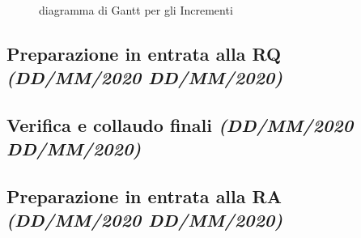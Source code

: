 \documentclass[../piano-di-progetto.tex]{subfiles}
\begin{document}
\begin{figure}[H]
  \centering
  
  \caption{diagramma di Gantt per gli Incrementi}%
~~\label{fig:gantt_incrementi}
\end{figure}
\subsection[Preparazione in entrata alla RQ]{Preparazione in entrata alla RQ {\normalsize\normalfont\itshape(DD/MM/2020  DD/MM/2020)}}%
\label{sub:preparazione_in_entrata_alla_rq}
\subsection[Verifica e collaudo finali]{Verifica e collaudo finali {\normalsize\normalfont\itshape(DD/MM/2020  DD/MM/2020)}}%
\label{sub:verifica_e_collaudo_finali}
\subsection[Preparazione in entrata alla RA]{Preparazione in entrata alla RA {\normalsize\normalfont\itshape(DD/MM/2020  DD/MM/2020)}}%
\label{sub:preparazione_in_entrata_alla_ra}
\end{document}
